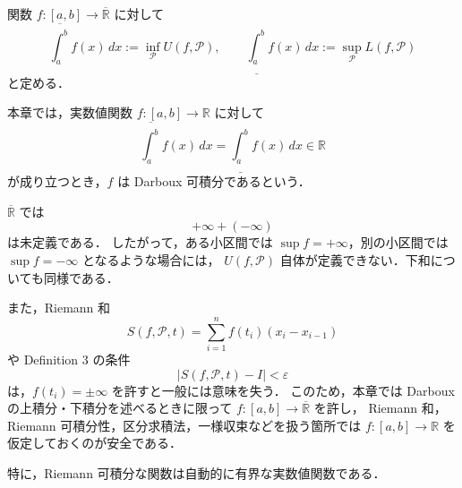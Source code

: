 \begin{definition}
関数 $f:[a,b]\to\overline{\mathbb R}$ に対して
\[
\overline{\int_a^b} f(x)\,dx := \inf_{\mathcal P} U(f,\mathcal P),
\qquad
\underline{\int_a^b} f(x)\,dx := \sup_{\mathcal P} L(f,\mathcal P)
\]
と定める．
\end{definition}

\begin{definition}
本章では，実数値関数 $f:[a,b]\to\mathbb R$ に対して
\[
\overline{\int_a^b} f(x)\,dx
=
\underline{\int_a^b} f(x)\,dx
\in\mathbb R
\]
が成り立つとき，$f$ は Darboux 可積分であるという．
\end{definition}

\begin{remark}[拡張実数を用いるときの注意]
$\overline{\mathbb R}$ では
\[
+\infty+(-\infty)
\]
は未定義である．
したがって，ある小区間では $\sup f=+\infty$，別の小区間では $\sup f=-\infty$ となるような場合には，
$U(f,\mathcal P)$ 自体が定義できない．下和についても同様である．

また，Riemann 和
\[
S(f,\mathcal P,t)=\sum_{i=1}^n f(t_i)(x_i-x_{i-1})
\]
や Definition 3 の条件
\[
|S(f,\mathcal P,t)-I|<\varepsilon
\]
は，$f(t_i)=\pm\infty$ を許すと一般には意味を失う．
このため，本章では Darboux の上積分・下積分を述べるときに限って
$f:[a,b]\to\overline{\mathbb R}$ を許し，
Riemann 和，Riemann 可積分性，区分求積法，一様収束などを扱う箇所では
$f:[a,b]\to\mathbb R$ を仮定しておくのが安全である．

特に，Riemann 可積分な関数は自動的に有界な実数値関数である．
\end{remark}


